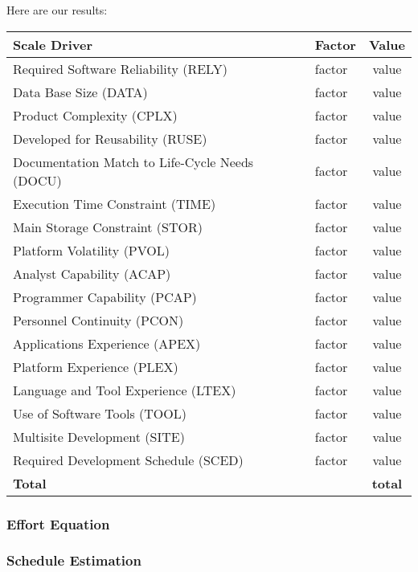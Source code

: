 \pagebreak
Here are our results:
\begin{center}
	\begin{tabular}{l l c}
		\hline
		\textbf{Scale Driver} & \textbf{Factor} & \textbf{Value} \\
		\hline \hline
		Required Software Reliability (RELY) & factor & value \\
		Data Base Size (DATA) & factor & value \\
		Product Complexity (CPLX) & factor & value \\
		Developed for Reusability (RUSE) & factor & value \\
		Documentation Match to Life-Cycle Needs (DOCU) & factor & value \\
		\hline
		Execution Time Constraint (TIME) & factor & value \\
		Main Storage Constraint (STOR) & factor & value \\
		Platform Volatility (PVOL) & factor & value \\
		\hline
		Analyst Capability (ACAP) & factor & value \\
		Programmer Capability (PCAP) & factor & value \\
		Personnel Continuity (PCON) & factor & value \\
		Applications Experience (APEX) & factor & value \\
		Platform Experience (PLEX) & factor & value \\
		Language and Tool Experience (LTEX) & factor & value \\
		\hline
		Use of Software Tools (TOOL) & factor & value \\
		Multisite Development (SITE) & factor & value \\
		\hline
		Required Development Schedule (SCED) & factor & value \\
		\hline \hline
		\textbf{Total} & & \textbf{total} \\
		\hline
	\end{tabular}
\end{center}

\subsubsection{Effort Equation}

\subsubsection{Schedule Estimation}